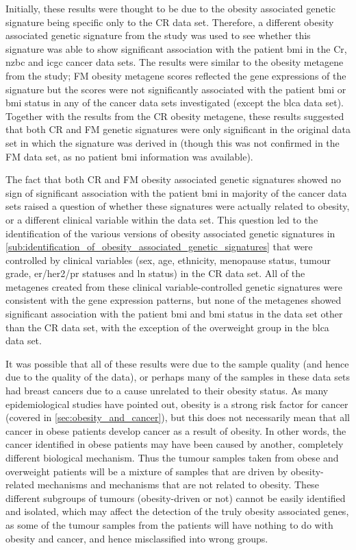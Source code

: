 Initially, these results were thought to be due to the obesity associated genetic signature being specific only to the CR data set.
Therefore, a different obesity associated genetic signature from the \citet{Fuentes-Mattei2014} study was used to see whether this signature was able to show significant association with the patient \gls{bmi} in the Cr, \gls{nzbc} and \gls{icgc} cancer data sets.
The results were similar to the obesity metagene from the \citet{Creighton2012} study; FM obesity metagene scores reflected the gene expressions of the signature but the scores were not significantly associated with the patient \gls{bmi} or \gls{bmi} status in any of the cancer data sets investigated (except the \gls{blca} data set).
Together with the results from the CR obesity metagene, these results suggested that both CR and FM genetic signatures were only significant in the original data set in which the signature was derived in (though this was not confirmed in the FM data set, as no patient \gls{bmi} information was available).

The fact that both CR and FM obesity associated genetic signatures showed no sign of significant association with the patient \gls{bmi} in majority of the cancer data sets raised a question of whether these signatures were actually related to obesity, or a different clinical variable within the data set.
This question led to the identification of the various versions of obesity associated genetic signatures in \cref{sub:identification_of_obesity_associated_genetic_signatures} that were controlled by clinical variables (sex, age, ethnicity, menopause status, tumour grade, \gls{er}/\gls{her2}/\gls{pr} statuses and \gls{ln} status) in the CR data set.
All of the metagenes created from these clinical variable-controlled genetic signatures were consistent with the gene expression patterns, but none of the metagenes showed significant association with the patient \gls{bmi} and \gls{bmi} status in the data set other than the CR data set, with the exception of the overweight group in the \gls{blca} data set.

It was possible that all of these results were due to the sample quality (and hence due to the quality of the data), or perhaps many of the samples in these data sets had breast cancers due to a cause unrelated to their obesity status.
As many epidemiological studies have pointed out, obesity is a strong risk factor for cancer (covered in \cref{sec:obesity_and_cancer}), but this does not necessarily mean that all cancer in obese patients develop cancer as a result of obesity.
In other words, the cancer identified in obese patients may have been caused by another, completely different biological mechanism.
Thus the tumour samples taken from obese and overweight patients will be a mixture of samples that are driven by obesity-related mechanisms and mechanisms that are not related to obesity.
These different subgroups of tumours (obesity-driven or not) cannot be easily identified and isolated, which may affect the detection of the truly obesity associated genes, as some of the tumour samples from the patients will have nothing to do with obesity and cancer, and hence misclassified into wrong groups.

